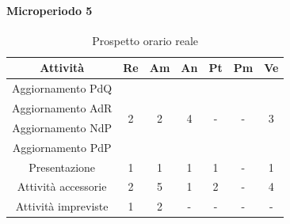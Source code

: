 \paragraph{Microperiodo 5}
\begin{table}[H]
	\centering
	\begin{tabular}{|c|c|c|c|c|c|c|}
		\hline
		\rowcolor{lighter-grayer}
		\textbf{Attività}   & \textbf{Re}        & \textbf{Am}        & \textbf{An}        & \textbf{Pt}        & \textbf{Pm}        & \textbf{Ve}        \\ \hline
		Aggiornamento PdQ   & \multirow{4}{*}{2} & \multirow{4}{*}{2} & \multirow{4}{*}{4} & \multirow{4}{*}{-} & \multirow{4}{*}{-} & \multirow{4}{*}{3} \\ \cline{1-1}
		Aggiornamento AdR   &                    &                    &                    &                    &                    &                    \\ \cline{1-1}
		Aggiornamento NdP   &                    &                    &                    &                    &                    &                    \\ \cline{1-1}
		Aggiornamento PdP   &                    &                    &                    &                    &                    &                    \\ \hline
		Presentazione       & 1                  & 1                  & 1                  & 1                  & -                  & 1                  \\ \hline
		Attività accessorie & 2                  & 5                  & 1                  & 2                  & -                  & 4                  \\ \hline
		Attività impreviste & 1                  & 2                  & -                  & -                  & -                  & -                  \\ \hline
	\end{tabular}
\caption{ Prospetto orario reale\\}
\end{table}

